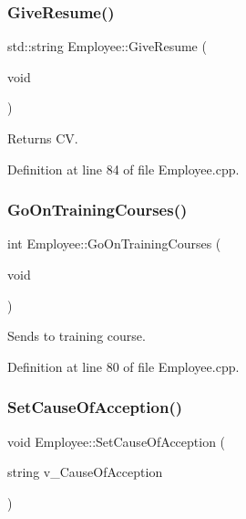 \subsubsection{\texorpdfstring{Give\+Resume()}{GiveResume()}}
{\footnotesize\ttfamily std\+::string Employee\+::\+Give\+Resume (\begin{DoxyParamCaption}\item[{void}]{ }\end{DoxyParamCaption})}



Returns CV. 



Definition at line 84 of file Employee.\+cpp.

\mbox{\label{class_employee_a8644c276b8a3cdb8bb62a71a492e574d}} 
\subsubsection{\texorpdfstring{Go\+On\+Training\+Courses()}{GoOnTrainingCourses()}}
{\footnotesize\ttfamily int Employee\+::\+Go\+On\+Training\+Courses (\begin{DoxyParamCaption}\item[{void}]{ }\end{DoxyParamCaption})}



Sends to training course. 



Definition at line 80 of file Employee.\+cpp.

\mbox{\label{class_employee_a7eebc60f8cfd43fe07fae6196a317b0c}} 
\subsubsection{\texorpdfstring{Set\+Cause\+Of\+Acception()}{SetCauseOfAcception()}}
{\footnotesize\ttfamily void Employee\+::\+Set\+Cause\+Of\+Acception (\begin{DoxyParamCaption}\item[{string}]{v\+\_\+\+Cause\+Of\+Acception }\end{DoxyParamCaption})}



